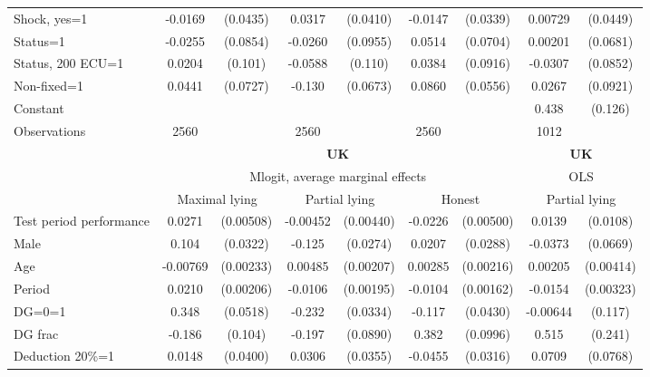 \begin{tabular}{l|cccccc|cc}
Shock, yes=1    &  -0.0169         & (0.0435)&   0.0317         & (0.0410)&  -0.0147         & (0.0339)&  0.00729         & (0.0449)\\
Status=1        &  -0.0255         & (0.0854)&  -0.0260         & (0.0955)&   0.0514         & (0.0704)&  0.00201         & (0.0681)\\
Status, 200 ECU=1&   0.0204         &  (0.101)&  -0.0588         &  (0.110)&   0.0384         & (0.0916)&  -0.0307         & (0.0852)\\
Non-fixed=1     &   0.0441         & (0.0727)&   -0.130\sym{*}  & (0.0673)&   0.0860         & (0.0556)&   0.0267         & (0.0921)\\
Constant        &                  &         &                  &         &                  &         &    0.438\sym{***}&  (0.126)\\
\hline
Observations    &     2560         &         &     2560         &         &     2560         &         &     1012         &         \\
\hline\hline
&\multicolumn{6}{c|}{\bf UK}&\multicolumn{2}{c}{\bf UK}\\ &\multicolumn{6}{c|}{Mlogit, average marginal effects }&\multicolumn{2}{c}{OLS}\\
                &\multicolumn{2}{c}{Maximal lying}&\multicolumn{2}{c}{Partial lying}&\multicolumn{2}{c}{Honest}  &\multicolumn{2}{c}{Partial lying}\\
\hline
Test period performance&   0.0271\sym{***}&(0.00508)& -0.00452         &(0.00440)&  -0.0226\sym{***}&(0.00500)&   0.0139         & (0.0108)\\
Male            &    0.104\sym{***}& (0.0322)&   -0.125\sym{***}& (0.0274)&   0.0207         & (0.0288)&  -0.0373         & (0.0669)\\
Age             & -0.00769\sym{***}&(0.00233)&  0.00485\sym{**} &(0.00207)&  0.00285         &(0.00216)&  0.00205         &(0.00414)\\
Period          &   0.0210\sym{***}&(0.00206)&  -0.0106\sym{***}&(0.00195)&  -0.0104\sym{***}&(0.00162)&  -0.0154\sym{***}&(0.00323)\\
DG=0=1          &    0.348\sym{***}& (0.0518)&   -0.232\sym{***}& (0.0334)&   -0.117\sym{***}& (0.0430)& -0.00644         &  (0.117)\\
DG frac         &   -0.186\sym{*}  &  (0.104)&   -0.197\sym{**} & (0.0890)&    0.382\sym{***}& (0.0996)&    0.515\sym{**} &  (0.241)\\
Deduction 20\%=1&   0.0148         & (0.0400)&   0.0306         & (0.0355)&  -0.0455         & (0.0316)&   0.0709         & (0.0768)\\

\end{tabular}

